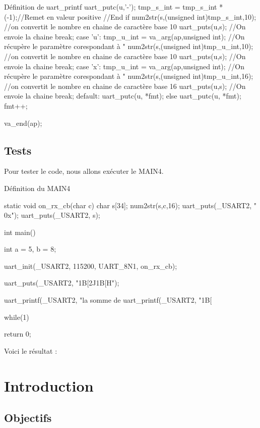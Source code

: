 {\begin{Cpp}{Définition de uart\_printf}
{{{						uart_putc(u,'-'); 
						tmp_s_int = tmp_s_int *(-1);//Remet en valeur positive
					}//End if
					num2str(s,(unsigned int)tmp_s_int,10);	//on convertit le nombre en chaine de caractère base 10
					uart_puts(u,s);						//On envoie la chaine
					break;
				case 'u':
					tmp_u_int = va_arg(ap,unsigned int);	//On récupère le paramètre corespondant à "%
					num2str(s,(unsigned int)tmp_u_int,10);	//on convertit le nombre en chaine de caractère base 10
					uart_puts(u,s);							//On envoie la chaine
					break;
				case 'x':
					tmp_u_int = va_arg(ap,unsigned int);	//On récupère le paramètre corespondant à "%
					num2str(s,(unsigned int)tmp_u_int,16);	//on convertit le nombre en chaine de caractère base 16
					uart_puts(u,s);							//On envoie la chaine
					break;
				default:
				    uart_putc(u, *fmt);
			}
		} else uart_putc(u, *fmt);
		fmt++;
	
	va_end(ap);
\end{Cpp}

\section{Tests}

Pour tester le code, nous allons exécuter le MAIN4.

\begin{Cpp}{Définition du MAIN4}

static void on_rx_cb(char c)
{
	char  s[34];
	num2str(s,c,16);
	uart_puts(_USART2, " 0x");
	uart_puts(_USART2, s);
}

int main()
{
	int a = 5, b = 8;

	uart_init(_USART2, 115200, UART_8N1, on_rx_cb);

	uart_puts(_USART2, "\x1B[2J\x1B[H");

	uart_printf(_USART2, "la somme de %
	uart_printf(_USART2, "\x1B[%

	while(1) {
	}

	return 0;
}
\end{Cpp}

Voici le résultat : 

\chapter{Introduction}
\section{Objectifs}


}
